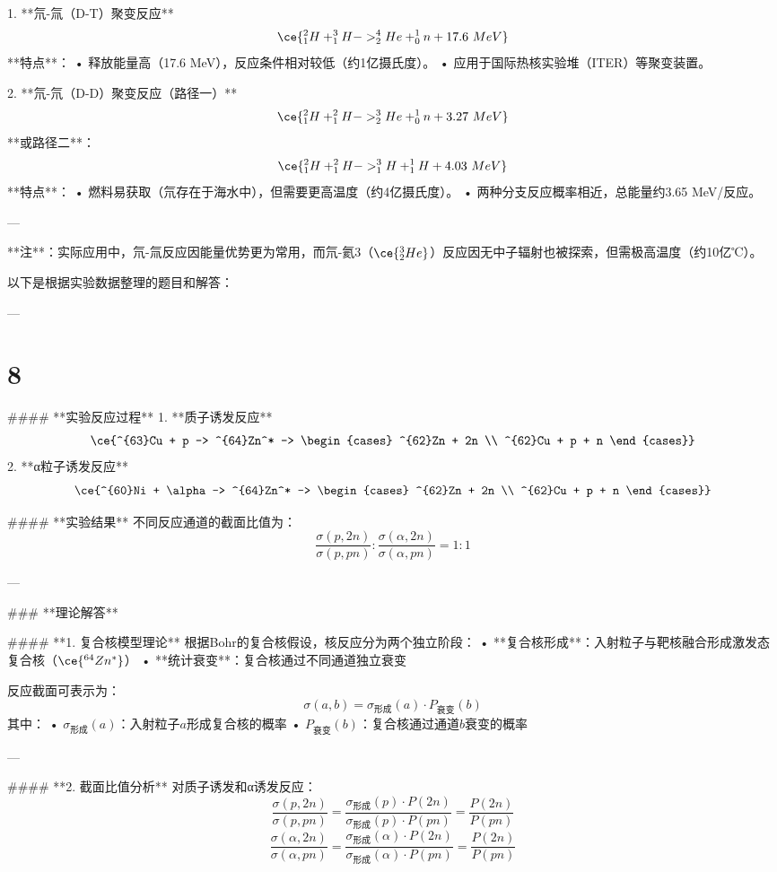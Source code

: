 \documentclass[12pt]{article}
\begin{document}
1. **氘-氚（D-T）聚变反应**  
   \[
   \ce{^2_1H + ^3_1H -> ^4_2He + ^1_0n + 17.6\ MeV}
   \]  
   **特点**：  
   • 释放能量高（17.6 MeV），反应条件相对较低（约1亿摄氏度）。  
   • 应用于国际热核实验堆（ITER）等聚变装置。  

2. **氘-氘（D-D）聚变反应（路径一）**  
   \[
   \ce{^2_1H + ^2_1H -> ^3_2He + ^1_0n + 3.27\ MeV}
   \]  
   **或路径二**：  
   \[
   \ce{^2_1H + ^2_1H -> ^3_1H + ^1_1H + 4.03\ MeV}
   \]  
   **特点**：  
   • 燃料易获取（氘存在于海水中），但需要更高温度（约4亿摄氏度）。  
   • 两种分支反应概率相近，总能量约3.65 MeV/反应。  

---

**注**：实际应用中，氘-氚反应因能量优势更为常用，而氘-氦3（\(\ce{^3_2He}\)）反应因无中子辐射也被探索，但需极高温度（约10亿℃）。

以下是根据实验数据整理的题目和解答：

---

\section*{8}

#### **实验反应过程**
1. **质子诱发反应**  
\[
\ce{^{63}Cu + p -> ^{64}Zn^* -> \begin{cases} 
^{62}Zn + 2n \\ 
^{62}Cu + p + n 
\end{cases}}
\]
2. **α粒子诱发反应**  
\[
\ce{^{60}Ni + \alpha -> ^{64}Zn^* -> \begin{cases} 
^{62}Zn + 2n \\ 
^{62}Cu + p + n 
\end{cases}}
\]

#### **实验结果**
不同反应通道的截面比值为：  
\[
\frac{\sigma(p,2n)}{\sigma(p,pn)} : \frac{\sigma(\alpha,2n)}{\sigma(\alpha,pn)} = 1 : 1
\]

---

### **理论解答**

#### **1. 复合核模型理论**
根据Bohr的复合核假设，核反应分为两个独立阶段：  
• **复合核形成**：入射粒子与靶核融合形成激发态复合核（\(\ce{^{64}Zn^*}\)）  
• **统计衰变**：复合核通过不同通道独立衰变  

反应截面可表示为：  
\[
\sigma(a,b) = \sigma_{\text{形成}}(a) \cdot P_{\text{衰变}}(b)
\]  
其中：  
• \(\sigma_{\text{形成}}(a)\)：入射粒子\(a\)形成复合核的概率  
• \(P_{\text{衰变}}(b)\)：复合核通过通道\(b\)衰变的概率  

---

#### **2. 截面比值分析**
对质子诱发和α诱发反应：  
\[
\frac{\sigma(p,2n)}{\sigma(p,pn)} = \frac{\sigma_{\text{形成}}(p) \cdot P(2n)}{\sigma_{\text{形成}}(p) \cdot P(pn)} = \frac{P(2n)}{P(pn)}  
\]  
\[
\frac{\sigma(\alpha,2n)}{\sigma(\alpha,pn)} = \frac{\sigma_{\text{形成}}(\alpha) \cdot P(2n)}{\sigma_{\text{形成}}(\alpha) \cdot P(pn)} = \frac{P(2n)}{P(pn)}  
\]  
\end{document}
